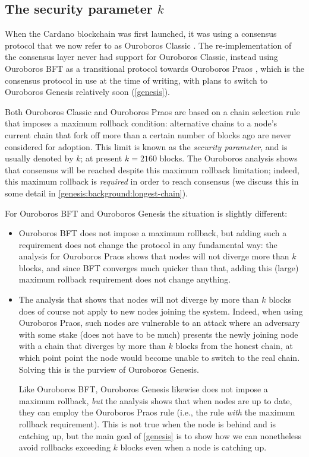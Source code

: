 \subsection{The security parameter $k$}
\label{consensus:overview:k}

When the Cardano blockchain was first launched, it was using a consensus
protocol that we now refer to as Ouroboros Classic \cite{cryptoeprint:2016:889}.
The re-implementation of the consensus layer never had support for Ouroboros
Classic, instead using Ouroboros BFT \cite{cryptoeprint:2018:1049} as a
transitional protocol towards Ouroboros Praos \cite{cryptoeprint:2017:573},
which is the consensus protocol in use at the time of writing, with plans to
switch to Ouroboros Genesis \cite{cryptoeprint:2018:378} relatively soon
(\cref{genesis}).

Both Ouroboros Classic and Ouroboros Praos are based on a chain selection rule
that imposes a maximum rollback condition: alternative chains to a node's
current chain that fork off more than a certain number of blocks ago are never
considered for adoption. This limit is known as the \emph{security parameter},
and is usually denoted by $k$; at present $k = 2160$ blocks. The Ouroboros
analysis shows that consensus will be reached despite this maximum rollback
limitation; indeed, this maximum rollback is \emph{required} in order to reach
consensus (we discuss this in some detail in
\cref{genesis:background:longest-chain}).

For Ouroboros BFT and Ouroboros Genesis the situation is slightly different:

\begin{itemize}
\item Ouroboros BFT does not impose a maximum rollback, but adding such a
requirement does not change the protocol in any fundamental way: the analysis
for Ouroboros Praos shows that nodes will not diverge more than $k$ blocks, and
since BFT converges much quicker than that, adding this (large) maximum rollback
requirement does not change anything.
\item The analysis that shows that nodes will not diverge by more than $k$
blocks does of course not apply to new nodes joining the system. Indeed, when
using Ouroboros Praos, such nodes are vulnerable to an attack where an adversary
with some stake (does not have to be much) presents the newly joining node with
a chain that diverges by more than $k$ blocks from the honest chain, at which
point point the node would become unable to switch to the real chain. Solving
this is the purview of Ouroboros Genesis.

Like Ouroboros BFT, Ouroboros Genesis likewise does not impose a maximum
rollback, \emph{but} the analysis \cite{cryptoeprint:2018:378} shows that when
nodes are up to date, they can employ the Ouroboros Praos rule (i.e., the rule
\emph{with} the maximum rollback requirement). This is not true when the node is
behind and is catching up, but the main goal of \cref{genesis} is to show how we
can nonetheless avoid rollbacks exceeding $k$ blocks even when a node is
catching up.
\end{itemize}

